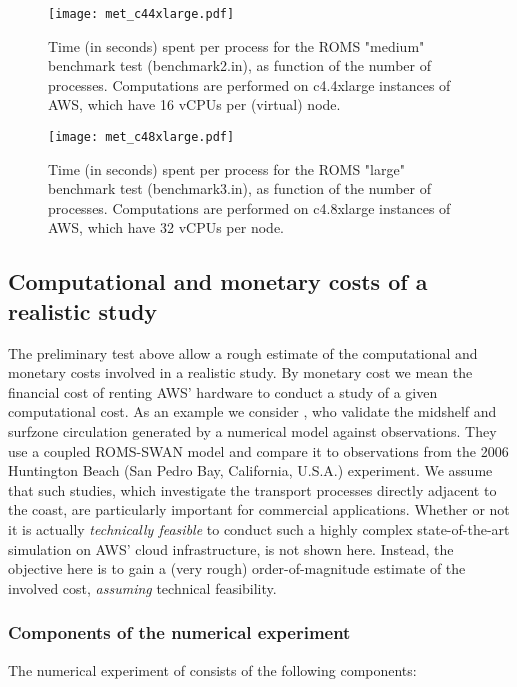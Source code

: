 \documentclass[12pt,a4paper]{article}
\begin{document}
\begin{figure}[H]
	\centering
	\texttt{[image: met\_c44xlarge.pdf]}
	\caption{Time (in seconds) spent per process for the ROMS "medium" benchmark test (benchmark2.in), as function of the number of processes. Computations are performed on c4.4xlarge instances of AWS, which have 16 vCPUs per (virtual) node.}
	\label{fig:met_c44xlarge}
\end{figure}

\begin{figure}[H]
	\centering
	\texttt{[image: met\_c48xlarge.pdf]}
	\caption{Time (in seconds) spent per process for the ROMS "large" benchmark test (benchmark3.in), as function of the number of processes. Computations are performed on c4.8xlarge instances of AWS, which have 32 vCPUs per node.}
	\label{fig:met_c48xlarge}
\end{figure}

\subsection{Computational and monetary costs of a realistic study}

The preliminary test above allow a rough estimate of the computational and monetary costs involved in a realistic study. By monetary cost we mean the financial cost of renting AWS' hardware to conduct a study of a given computational cost. As an example we consider \cite{kumar2015midshelf}, who validate the midshelf and surfzone circulation generated by a numerical model against observations.  They use a coupled ROMS-SWAN model and compare it to observations from the 2006 Huntington Beach (San Pedro Bay, California, U.S.A.) experiment. We assume that such studies, which investigate the transport processes directly adjacent to the coast, are particularly important for commercial applications. Whether or not it is actually \emph{technically feasible} to conduct such a highly complex state-of-the-art simulation on AWS' cloud infrastructure, is not shown here. Instead, the objective here is to gain a (very rough) order-of-magnitude estimate of the involved cost, \emph{assuming} technical feasibility. 

\subsubsection{Components of the numerical experiment}

The numerical experiment of \cite{kumar2015midshelf} consists of the following components:
\end{document}
